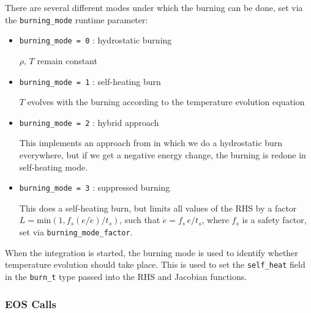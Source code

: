 There are several different modes under which the burning can be done, set
via the {\tt burning\_mode} runtime parameter:
\begin{itemize}
\item {\tt burning\_mode = 0} : hydrostatic burning

  $\rho$, $T$ remain constant

\item {\tt burning\_mode = 1} : self-heating burn

  $T$ evolves with the burning according to the temperature evolution equation

\item {\tt burning\_mode = 2} : hybrid approach

  This implements an approach from \cite{raskin:2010} in which we do a 
  hydrostatic burn everywhere, but if we get a negative energy change,
  the burning is redone in self-heating mode.

\item {\tt burning\_mode = 3} : suppressed burning

  This does a self-heating burn, but limits all values of the RHS
  by a factor $L = \text{min}(1, f_s (e / \dot{e}) / t_s)$, such
  that $\dot{e} = f_s\, e / t_s$, where $f_s$ is a safety factor,
  set via {\tt burning\_mode\_factor}.

  
\end{itemize}

When the integration is started, the burning mode is used to identify
whether temperature evolution should take place.  This is used to
set the {\tt self\_heat} field in the {\tt burn\_t} type passed
into the RHS and Jacobian functions.



\subsubsection{EOS Calls}

